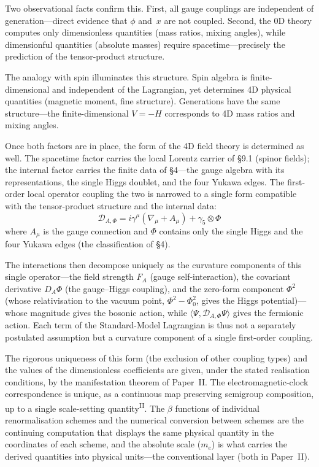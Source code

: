 \documentclass[12pt,a4paper]{article}
\newcommand{\PII}{\textsuperscript{\textup{II}}}
\begin{document}
Two observational facts confirm this.
First, all gauge couplings are independent of
generation---direct evidence that $\phi$ and~$x$
are not coupled.
Second, the 0D theory computes only dimensionless quantities
(mass ratios, mixing angles),
while dimensionful quantities (absolute masses) require
spacetime---precisely the prediction of the
tensor-product structure.

The analogy with spin illuminates this structure.
Spin algebra is finite-dimensional and independent of the
Lagrangian, yet determines 4D physical quantities
(magnetic moment, fine structure).
Generations have the same structure---the finite-dimensional
$V = -H$ corresponds to 4D mass ratios and mixing angles.

Once both factors are in place, the form of the 4D field theory is determined as well. The spacetime factor carries the local Lorentz carrier of \S9.1 (spinor fields); the internal factor carries the finite data of \S4---the gauge algebra with its representations, the single Higgs doublet, and the four Yukawa edges. The first-order local operator coupling the two is narrowed to a single form compatible with the tensor-product structure and the internal data:
\begin{equation}
\mathcal{D}_{A,\Phi} = i\gamma^\mu(\nabla_\mu + A_\mu) + \gamma_5 \otimes \Phi
\end{equation}
where $A_\mu$ is the gauge connection and $\Phi$ contains only the single Higgs and the four Yukawa edges (the classification of \S4).

The interactions then decompose uniquely as the curvature components of this single operator---the field strength $F_A$ (gauge self-interaction), the covariant derivative $D_A\Phi$ (the gauge--Higgs coupling), and the zero-form component $\Phi^2$ (whose relativisation to the vacuum point, $\Phi^2 - \Phi_0^2$, gives the Higgs potential)---whose magnitude gives the bosonic action, while $\langle\Psi, \mathcal{D}_{A,\Phi}\Psi\rangle$ gives the fermionic action. Each term of the Standard-Model Lagrangian is thus not a separately postulated assumption but a curvature component of a single first-order coupling.

The rigorous uniqueness of this form (the exclusion of other coupling types) and the values of the dimensionless coefficients are given, under the stated realisation conditions, by the manifestation theorem of Paper~II. The electromagnetic-clock correspondence is unique, as a continuous map preserving semigroup composition, up to a single scale-setting quantity\PII{}. The $\beta$ functions of individual renormalisation schemes and the numerical conversion between schemes are the continuing computation that displays the same physical quantity in the coordinates of each scheme, and the absolute scale ($m_e$) is what carries the derived quantities into physical units---the conventional layer (both in Paper~II).
\end{document}
